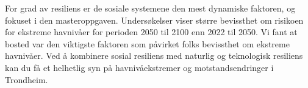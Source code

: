 For grad av resiliens er de sosiale systemene den mest dynamiske faktoren, og fokuset i den masteroppgaven. Undersøkelser viser større bevissthet om risikoen for ekstreme havnivåer for perioden 2050 til 2100 enn 2022 til 2050. Vi fant at bosted var den viktigste faktoren som påvirket folks bevissthet om ekstreme havnivåer. Ved å kombinere sosial resiliens med naturlig og teknologisk resiliens kan du få et helhetlig syn på havnivåekstremer og motstandsendringer i Trondheim.